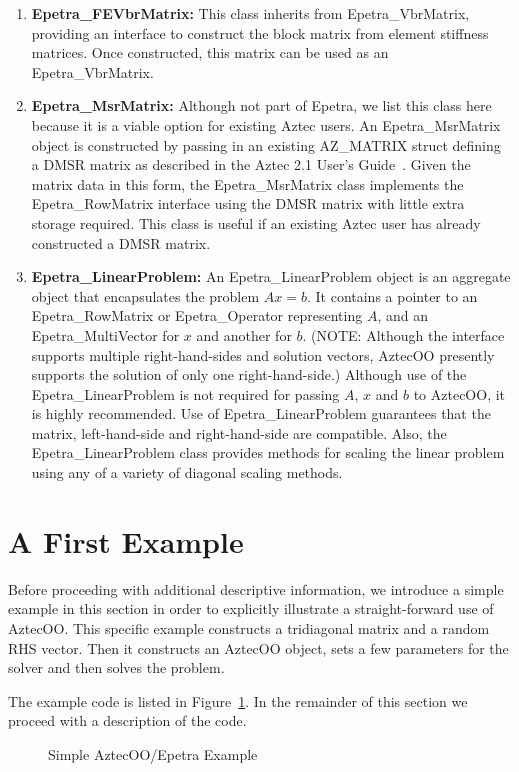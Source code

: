 \documentclass[12pt,relax]{AztecOOUserGuide}
\newcommand{\multivector}{Epetra\_MultiVector}
\newcommand{\vbrmatrix}{Epetra\_VbrMatrix}
\newcommand{\rowmatrix}{Epetra\_RowMatrix}
\newcommand{\linearproblem}{Epetra\_LinearProblem}
\newcommand{\operator}{Epetra\_Operator}
\newcommand{\fevbrmatrix}{Epetra\_FE\-Vbr\-Matrix}
\newcommand{\msrmatrix}{Epetra\_MsrMatrix}
\begin{document}
\begin{enumerate}
\item{\bf \fevbrmatrix{}:} This class inherits from \vbrmatrix,
providing an interface to construct the block matrix from element stiffness
matrices.  Once constructed, this matrix can be used as an \vbrmatrix{}.
\item{\bf \msrmatrix{}:} Although not part of Epetra, we list this
class here because it is a viable option for existing Aztec users.
An \msrmatrix{} object is constructed by passing in an existing
AZ\_MATRIX struct defining a DMSR matrix as described in the Aztec 2.1
User's Guide~\cite{Aztec2.1}. Given the matrix data in this form, the
\msrmatrix{} class implements the \rowmatrix{} interface using the
DMSR matrix with little extra storage required.  This class is useful
if an existing Aztec user has already constructed a DMSR matrix.
\item{\bf \linearproblem{}:} An \linearproblem{} object is an
aggregate object that encapsulates the problem $Ax=b$.  It contains a
pointer to an \rowmatrix{} or \operator{} representing $A$, and an
\multivector{} for $x$ and another for $b$.  (NOTE:  Although the
interface supports multiple right-hand-sides and solution vectors,
AztecOO presently supports the solution of only one right-hand-side.)
Although use of the \linearproblem{} is not required for passing $A$,
$x$ and $b$ to AztecOO, it is highly recommended.  Use of
\linearproblem{} guarantees that the matrix, left-hand-side and
right-hand-side are compatible.  Also, the \linearproblem{} class
provides methods for scaling the linear problem using any of a variety
of diagonal scaling methods.
\end{enumerate}




\section{A First Example}
\label{Section:FirstExample}
Before proceeding with additional descriptive information, we
introduce a simple example in this section in order to explicitly
illustrate a straight-forward use of AztecOO.  This specific example
constructs a tridiagonal matrix and a random RHS vector.  Then it
constructs an AztecOO object, sets a few parameters for the solver and
then solves the problem.

The example code is listed in Figure~\ref{Figure:FirstExample}.
In the remainder of this section we proceed with a
description of the code.
\begin{figure}
\begin{center}

\end{center}
\caption{\label{Figure:FirstExample} Simple AztecOO/Epetra Example}
\end{figure}
\end{document}
